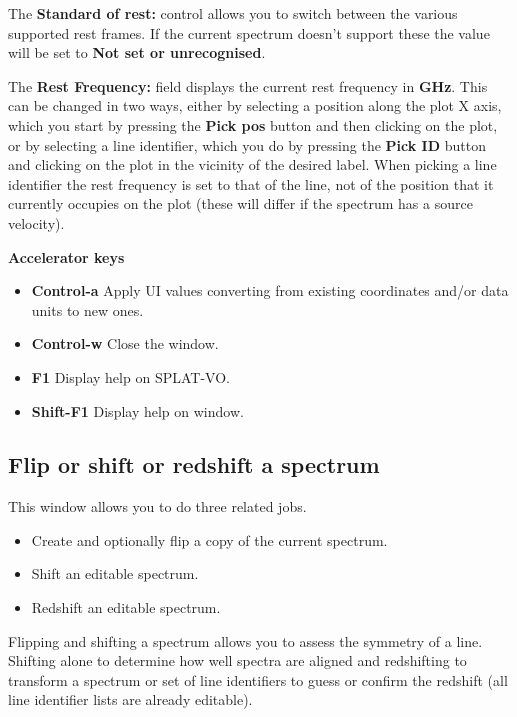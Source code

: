 \documentclass[twoside,11pt]{article}
\renewcommand{\_}{\texttt{\symbol{95}}}
\newcommand{\SPLAT}{\textsf{SPLAT-VO}}
\newcommand{\labelitem}[1]{\textbf{#1}}
\newcommand{\subheading}[1]{\textbf{\large{#1}}}
\begin{document}
The \labelitem{Standard of rest:} control allows you to switch between
the various supported rest frames. If the current spectrum doesn't support
these the value will be set to \labelitem{Not set or unrecognised}.

The \labelitem{Rest Frequency:} field displays the current rest frequency in
\labelitem{GHz}. This can be changed in two ways, either by selecting a
position along the plot X axis, which you start by pressing the
\labelitem{Pick pos} button and then clicking on the plot, or by selecting a
line identifier, which you do by pressing the \labelitem{Pick ID} button and
clicking on the plot in the vicinity of the desired label. When picking
a line identifier the rest frequency is set to that of the line, not of the
position that it currently occupies on the plot (these will differ if
the spectrum has a source velocity).

\subheading{Accelerator keys}

\begin{itemize}
\item \labelitem{Control-a} Apply UI values converting from existing
coordinates and/or data units to new ones.

\item \labelitem{Control-w} Close the window.
\item \labelitem{F1} Display help on \SPLAT.
\item \labelitem{Shift-F1} Display help on window.
\end{itemize}


\newpage
\subsection{Flip or shift or redshift a spectrum}

This window allows you to do three related jobs.
\begin{itemize}
\item Create and optionally flip a copy of the current spectrum.
\item Shift an editable spectrum.
\item Redshift an editable spectrum.
\end{itemize}

Flipping and shifting a spectrum allows you to assess the symmetry of a
line. Shifting alone to determine how well spectra are aligned and redshifting
to transform a spectrum or set of line identifiers to guess or confirm the
redshift (all line identifier lists are already editable).
\end{document}

